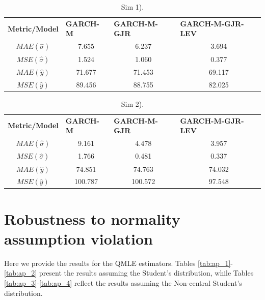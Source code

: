 \documentclass[authoryear, 1p]{elsarticle}
\numberwithin{equation}{section}
\begin{document}
\begin{table}[h!]
\centering
\caption{Sim 1).}
\label{tab:ap_7}
\begin{tabular}{cccc}
\hline
\hline
\textbf{Metric/Model} & \multicolumn{1}{l}{\textbf{GARCH-M}} & \multicolumn{1}{l}{\textbf{GARCH-M-GJR}} & \multicolumn{1}{l}{\textbf{GARCH-M-GJR-LEV}} \\
$MAE(\hat{\sigma})$   & 7.655         & 6.237              & 3.694                   \\
$MSE(\hat{\sigma})$   & 1.524         & 1.060              & 0.377                   \\
$MAE(\hat{y})$     & 71.677        & 71.453             & 69.117                  \\
$MSE(\hat{y})$     & 89.456        & 88.755             & 82.025                  \\
\hline 
\hline
\end{tabular}
\end{table}

\begin{table}[h!]
\centering
\caption{Sim 2).}
\label{tab:ap_8}
\begin{tabular}{cccc}
\hline
\hline
\textbf{Metric/Model} & \multicolumn{1}{l}{\textbf{GARCH-M}} & \multicolumn{1}{l}{\textbf{GARCH-M-GJR}} & \multicolumn{1}{l}{\textbf{GARCH-M-GJR-LEV}} \\
$MAE(\hat{\sigma})$   & 9.161         & 4.478              & 3.957                   \\
$MSE(\hat{\sigma})$   & 1.766         & 0.481            & 0.337                  \\
$MAE(\hat{y})$     & 74.851        & 74.763             & 74.032                  \\
$MSE(\hat{y})$     & 100.787        & 100.572             & 97.548                  \\
\hline 
\hline
\end{tabular}
\end{table}



\section{Robustness to normality assumption violation}

Here we provide the results for the QMLE estimators. Tables \ref{tab:ap_1}-\ref{tab:ap_2} present the results assuming the Student's distribution, while Tables \ref{tab:ap_3}-\ref{tab:ap_4} reflect the results assuming the Non-central Student's distribution.
\end{document}

